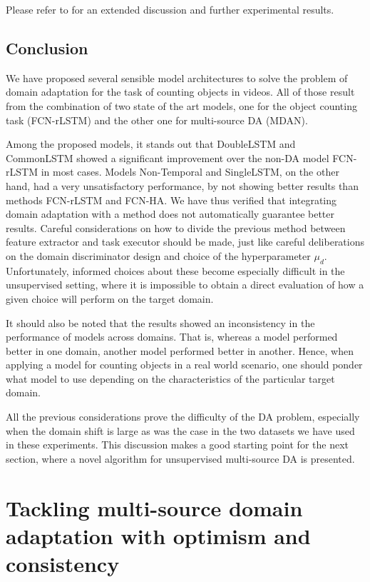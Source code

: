 Please refer to \citet{ThesisFrancisco} for an extended discussion and further experimental results.

\subsection{Conclusion}

We have proposed several sensible model architectures to solve the problem of domain adaptation for the task of counting objects in videos. All of those result from the combination of two state of the art models, one for the object counting task (FCN-rLSTM) and the other one for multi-source DA (MDAN).

Among the proposed models, it stands out that DoubleLSTM and CommonLSTM showed a significant improvement over the non-DA model FCN-rLSTM in most cases. Models Non-Temporal and SingleLSTM, on the other hand, had a very unsatisfactory performance, by not showing better results than methods FCN-rLSTM and FCN-HA. We have thus verified that integrating domain adaptation with a method does not automatically guarantee better results. Careful considerations on how to divide the previous method between feature extractor and task executor should be made, just like careful deliberations on the domain discriminator design and choice of the hyperparameter $\mu_d$. Unfortunately, informed choices about these become especially difficult in the unsupervised setting, where it is impossible to obtain a direct evaluation of how a given choice will perform on the target domain.

It should also be noted that the results showed an inconsistency in the performance of models across domains. That is, whereas a model performed better in one domain, another model performed better in another. Hence, when applying a model for counting objects in a real world scenario, one should ponder what model to use depending on the characteristics of the particular target domain.

All the previous considerations prove the difficulty of the DA problem, especially when the domain shift is large as was the case in the two datasets we have used in these experiments. This discussion makes a good starting point for the next section, where a novel algorithm for unsupervised multi-source DA is presented.

\section{Tackling multi-source domain adaptation with optimism and consistency}
\label{sec:modafm}

